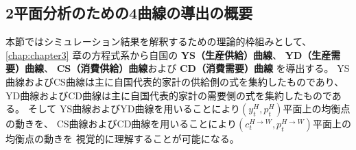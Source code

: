 
\subsection{2平面分析のための4曲線の導出の概要}
\label{sec:chapter5_two_plane_overview}
本節ではシミュレーション結果を解釈するための理論的枠組みとして、
\ref{chap:chapter3}
章の方程式系から自国の
\textbf{YS（生産供給）曲線}、
\textbf{YD（生産需要）曲線}、
\textbf{CS（消費供給）曲線}および
\textbf{CD（消費需要）曲線}
を導出する。
YS曲線およびCS曲線は主に自国代表的家計の供給側の式を集約したものであり、
YD曲線およびCD曲線は主に自国代表的家計の需要側の式を集約したものである。
そして
YS曲線およびYD曲線を用いることにより\((y_t^H,p_t^H)\)平面上の均衡点の動きを、
CS曲線およびCD曲線を用いることにより\((c_t^{H\to W},p_t^{H\to W})\)平面上の均衡点の動きを
視覚的に理解することが可能になる。


